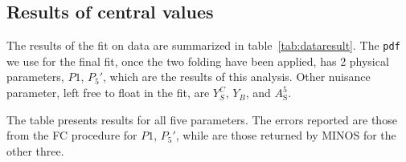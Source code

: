 \clearpage

\subsection{Results of central values}
\label{sec:res-centval}

The results of the fit on data are summarized in table~\ref{tab:dataresult}.
The {\tt pdf} we use for the final fit, once the two folding have been applied, has 2 physical parameters, $P1$, $P_5'$, which are the results of this analysis.
Other nuisance parameter, left free to float in the fit, are $Y^{C}_{S}$, $Y_{B}$, and $A^5_\mathrm{S}$.

The table presents results for all five parameters.
The errors reported are those from the FC procedure for $P1$, $P_5'$, while are those returned by MINOS for the other three.


